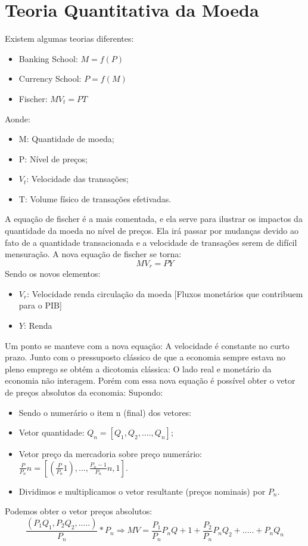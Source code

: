 \documentclass[12pt,a4paper,oneside,brazil]{abntex2}
\begin{document}
\section{Teoria Quantitativa da Moeda}
Existem algumas teorias diferentes:
\begin{itemize}
\item Banking School: $ M = f(P) $
\item Currency School: $ P = f(M) $
\item Fischer: $ M V_t = P T $
\end{itemize}
Aonde:
\begin{itemize}
\item M: Quantidade de moeda;
\item P: Nível de preços;
\item $V_t$: Velocidade das transações;
\item T: Volume físico de transações efetivadas.
\end{itemize}
A equação de fischer é a mais comentada, e ela serve para ilustrar os impactos da quantidade da moeda no nível de preços. Ela irá passar por mudanças devido ao fato de a quantidade transacionada e a velocidade de transações serem de difícil mensuração. A nova equação de fischer se torna:
\[ M V_r = P Y\] 
Sendo os novos elementos:
\begin{itemize}
\item $ V_r$: Velocidade renda circulação da moeda [Fluxos monetários que contribuem para o PIB]
\item $Y$: Renda
\end{itemize}
Um ponto se manteve com a nova equação: A velocidade é constante no curto prazo. Junto com o pressuposto clássico de que a economia sempre estava no pleno emprego se obtém a dicotomia clássica: O lado real e monetário da economia não interagem.  Porém com essa nova equação é possível obter o vetor de preços absolutos da economia: \newline
Supondo:
\begin{itemize}
\item Sendo o numerário o item n (final) dos vetores:
\item Vetor quantidade: $Q_n  = [Q_1,Q_2, ...., Q_n]$;
\item Vetor preço da mercadoria sobre preço numerário: $\frac{P}{P_n}n =[(\frac{P}{P_n}1), ..., \frac{P_n-1}{P_n}n, 1]$.
\item Dividimos e multiplicamos o vetor resultante (preços nominais) por $P_n$.
\end{itemize}
Podemos obter o vetor preços absolutos:
\[ \frac{(P_1 Q_1, P_2 Q_2,.....)}{P_n}*P_n \Rightarrow M V = \frac{P_1}{P_n} P_n Q+1 + \frac{P_2}{P_n} P_n Q_2  + ..... + P_n Q_n\]
\end{document}
